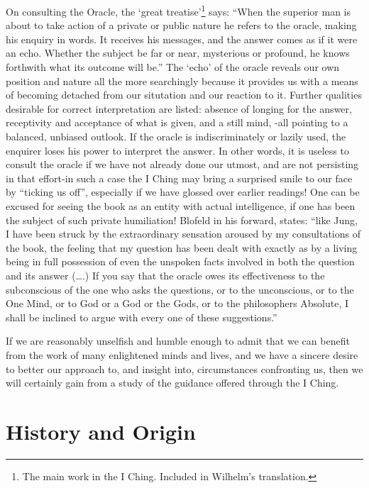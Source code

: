 \documentclass[11pt]{book}
\begin{document}
On consulting the Oracle, the `great treatise'\footnote{The main work in the I Ching. Included in Wilhelm's translation.} says: ``When the superior man is about to take action of a private or public nature he refers to the oracle, making his enquiry in words. It receives his messages, and the answer comes as if it were an echo. Whether the subject be far or near, mysterious or profound, he knows forthwith what its outcome will be.'' The `echo' of the oracle reveals our own position and nature all the more searchingly because it provides us with a means of becoming detached from our situtation and our reaction to it. Further qualities desirable for correct interpretation are listed: absence of longing for the answer, receptivity and acceptance of what is given, and a still mind, -all pointing to a balanced, unbiased outlook. If the oracle is indiscriminately or lazily used, the enquirer loses his power to interpret the answer. In other words, it is useless to consult the oracle if we have not already done our utmost, and are not persisting in that effort-in such a case the I Ching may bring a surprised smile to our face by ``ticking us off'', especially if we have glossed over earlier readings! One can be excused for seeing the book as an entity with actual intelligence, if one has been the subject of such private humiliation! Blofeld in his forward, states: ``like Jung, I have been struck by the extraordinary sensation aroused by my consultations of the book, the feeling that my question has been dealt with exactly as by a living being in full possession of even the unspoken facts involved in both the question and its answer (\ldots.) If you say that the oracle owes its effectiveness to the subconscious of the one who asks the questions, or to the unconscious, or to the One Mind, or to God or a God or the Gods, or to the philosophers Absolute, I shall be inclined to argue with every one of these suggestions.''

If we are reasonably unselfish and humble enough to admit that we can benefit from the work of many enlightened minds and lives, and we have a sincere desire to better our approach to, and insight into, circumstances confronting us, then we will certainly gain from a study of the guidance offered through the I Ching.

\hypertarget{history-and-origin}{%
\section{History and Origin}\label{history-and-origin}}
\end{document}

